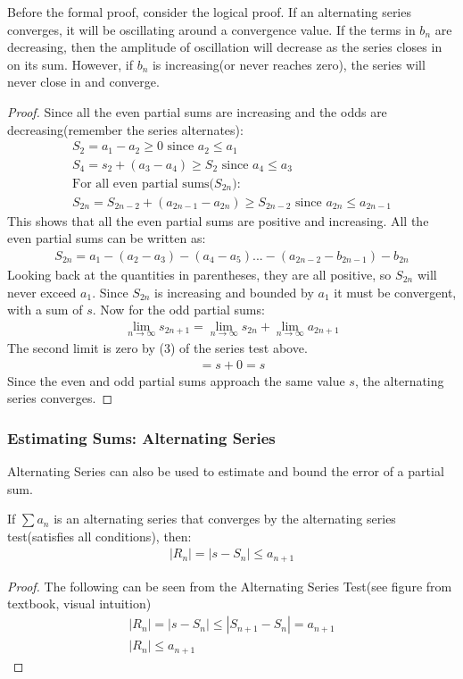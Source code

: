 \documentclass{article}
\begin{document}
Before the formal proof, consider the logical proof. If an alternating series converges, it will be oscillating around a convergence value. If the terms in $b_n$ are decreasing, then the amplitude of oscillation will decrease as the series closes in on its sum. However, if $b_n$ is increasing(or never reaches zero), the series will never close in and converge.
\begin{proof}
Since all the even partial sums are increasing and the odds are decreasing(remember the series alternates):
\begin{gather*}
    S_2 = a_1 - a_2 \geqslant 0 \textrm{ since $a_2 \leqslant a_1$}\\
    S_4 = s_2 + (a_3 - a_4) \geqslant S_2 \textrm{ since $a_4 \leqslant a_3$}\\
    \textrm{For all even partial sums($S_{2n}$):}\\
    S_{2n} = S_{2n-2} + (a_{2n-1} - a_{2n}) \geqslant S_{2n-2} \textrm{ since $a_{2n} \leqslant a_{2n-1}$}
\end{gather*}
This shows that all the even partial sums are positive and increasing. All the even partial sums can be written as:
\begin{gather*}
    S_{2n} = a_1 - (a_2 - a_3) - (a_4 - a_5) ... - (a_{2n-2} - b_{2n-1}) - b_{2n}
\end{gather*}
Looking back at the quantities in parentheses, they are all positive, so $S_{2n}$ will never exceed $a_1$. Since $S_{2n}$ is increasing and bounded by $a_1$ it must be convergent, with a sum of $s$. Now for the odd partial sums:
\begin{gather*}
    \lim_{n \to \infty} s_{2n+1} = \lim_{n \to \infty} s_{2n} + \lim_{n \to \infty} a_{2n+1}
\end{gather*}
The second limit is zero by (3) of the series test above.
\begin{gather*}
    = s + 0 = s
\end{gather*}
Since the even and odd partial sums approach the same value $s$, the alternating series converges.
\end{proof}
\subsubsection{Estimating Sums: Alternating Series}
Alternating Series can also be used to estimate and bound the error of a partial sum.

If $\sum a_n$ is an alternating series that converges by the alternating series test(satisfies all conditions), then:
\begin{gather*}
    |R_n| = |s - S_n| \leqslant a_{n+1}
\end{gather*}
\begin{proof}
The following can be seen from the Alternating Series Test(see figure from textbook, visual intuition)
\begin{gather*}
    |R_n| = |s - S_n| \leqslant |S_{n+1} - S_n| = a_{n+1}\\
    |R_n| \leqslant a_{n+1}
\end{gather*}
\end{proof}
\end{document}
